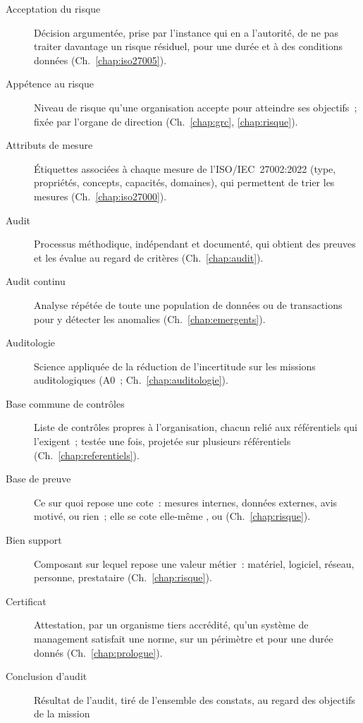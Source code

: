 \begin{description}
    \item[Acceptation du risque] Décision argumentée, prise par l'instance
          qui en a l'autorité, de ne pas traiter davantage un risque
          résiduel, pour une durée et à des conditions données
          (Ch.~\ref{chap:iso27005}).
    \item[Appétence au risque] Niveau de risque qu'une organisation accepte
          pour atteindre ses objectifs~; fixée par l'organe de direction
          (Ch.~\ref{chap:grc}, \ref{chap:risque}).
    \item[Attributs de mesure] Étiquettes associées à chaque mesure de
          l'ISO/IEC~27002:2022 (type, propriétés, concepts, capacités,
          domaines), qui permettent de trier les mesures
          (Ch.~\ref{chap:iso27000}).
    \item[Audit] Processus méthodique, indépendant et documenté, qui obtient
          des preuves et les évalue au regard de critères
          (Ch.~\ref{chap:audit}).
    \item[Audit continu] Analyse répétée de toute une population de
          données ou de transactions pour y détecter les anomalies
          (Ch.~\ref{chap:emergents}).
    \item[Auditologie] Science appliquée de la réduction de l'incertitude
          sur les missions auditologiques (A0~; Ch.~\ref{chap:auditologie}).
    \item[Base commune de contrôles] Liste de contrôles propres à
          l'organisation, chacun relié aux référentiels qui l'exigent~;
          testée une fois, projetée sur plusieurs référentiels
          (Ch.~\ref{chap:referentiels}).
    \item[Base de preuve] Ce sur quoi repose une cote~: mesures internes,
          données externes, avis motivé, ou rien~; elle se cote elle-même
          \OUI{}, \NON{} ou \NEK{} (Ch.~\ref{chap:risque}).
    \item[Bien support] Composant sur lequel repose une valeur métier~:
          matériel, logiciel, réseau, personne, prestataire
          (Ch.~\ref{chap:risque}).
    \item[Certificat] Attestation, par un organisme tiers accrédité, qu'un
          système de management satisfait une norme, sur un périmètre et
          pour une durée donnés (Ch.~\ref{chap:prologue}).
    \item[Conclusion d'audit] Résultat de l'audit, tiré de l'ensemble des
          constats, au regard des objectifs de la mission

\end{description}

